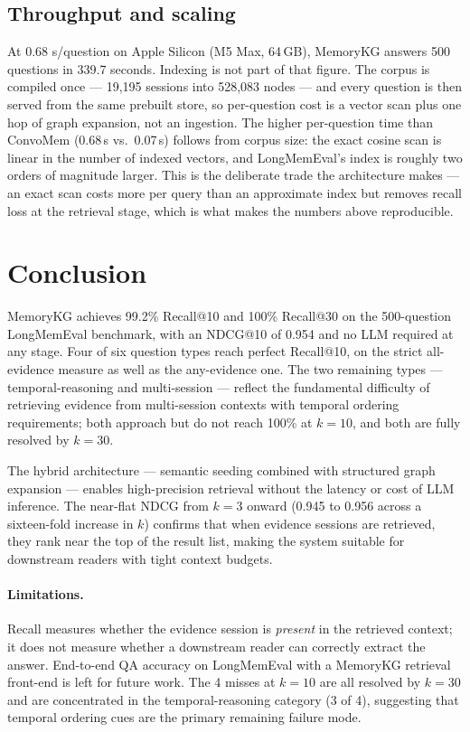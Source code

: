 \documentclass[11pt,a4paper]{article}
\begin{document}
\subsection{Throughput and scaling}

At 0.68 s/question on Apple Silicon (M5 Max, 64\,GB), MemoryKG answers 500
questions in 339.7 seconds.
Indexing is not part of that figure. The corpus is compiled once --- 19,195
sessions into 528,083 nodes --- and every question is then served from the same
prebuilt store, so per-question cost is a vector scan plus one hop of graph
expansion, not an ingestion.
The higher per-question time than ConvoMem (0.68\,s vs.\ 0.07\,s) follows from
corpus size: the exact cosine scan is linear in the number of indexed vectors,
and LongMemEval's index is roughly two orders of magnitude larger.
This is the deliberate trade the architecture makes --- an exact scan costs more
per query than an approximate index but removes recall loss at the retrieval
stage, which is what makes the numbers above reproducible.

\section{Conclusion}
\label{sec:conclusion}

MemoryKG achieves 99.2\% Recall@10 and 100\% Recall@30 on the 500-question
LongMemEval benchmark, with an NDCG@10 of 0.954 and no LLM required at any stage.
Four of six question types reach perfect Recall@10, on the strict all-evidence
measure as well as the any-evidence one.
The two remaining types --- temporal-reasoning and multi-session --- reflect the
fundamental difficulty of retrieving evidence from multi-session contexts with
temporal ordering requirements; both approach but do not reach 100\% at $k{=}10$,
and both are fully resolved by $k{=}30$.

The hybrid architecture --- semantic seeding combined with structured graph
expansion --- enables high-precision retrieval without the latency or cost of
LLM inference.
The near-flat NDCG from $k{=}3$ onward (0.945 to 0.956 across a
sixteen-fold increase in $k$) confirms that when evidence sessions are
retrieved, they rank near the top of the result list, making the system
suitable for downstream readers with tight context budgets.

\paragraph{Limitations.}
Recall measures whether the evidence session is \emph{present} in the retrieved
context; it does not measure whether a downstream reader can correctly extract
the answer.
End-to-end QA accuracy on LongMemEval with a MemoryKG retrieval front-end is
left for future work.
The 4 misses at $k{=}10$ are all resolved by $k{=}30$ and are concentrated in
the temporal-reasoning category (3 of 4), suggesting that temporal ordering cues
are the primary remaining failure mode.
\end{document}
